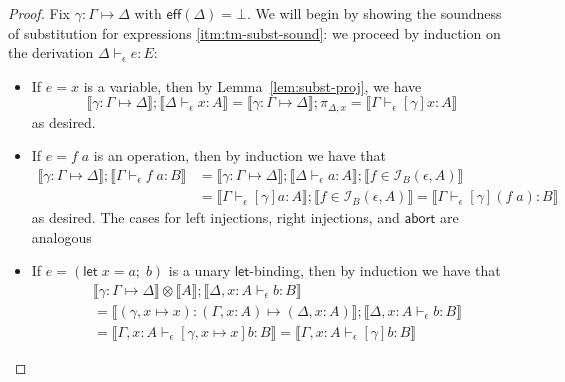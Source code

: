 \documentclass[acmsmall,screen,review]{acmart}
\newcommand{\mc}[1]{\ensuremath{\mathcal{#1}}}
\newcommand{\ms}[1]{\ensuremath{\mathsf{#1}}}
\newcommand{\letexpr}[3]{\ensuremath{\ms{let}\;#1 = #2;\;#3}}
\newcommand{\bhyp}[2]{#1 : #2}
\newcommand{\hasty}[4]{#1 \vdash_{#2} #3: {#4}}
\newcommand{\isop}[4]{#1 \in \mc{I}_{#4}(#2, #3)}
\newcommand{\issubst}[3]{#1: #2 \mapsto #3}
\newcommand{\dnt}[1]{\llbracket{#1}\rrbracket}
\begin{document}
\soundnesssubst*

\label{proof:soundness-subst}

\begin{proof}
  Fix $\issubst{\gamma}{\Gamma}{\Delta}$ with $\ms{eff}(\Delta) = \bot$. We will begin by showing
  the soundness of substitution for expressions \ref{itm:tm-subst-sound}: we proceed by induction
  on the derivation $\hasty{\Delta}{\epsilon}{e}{E}$:
  \begin{itemize}[leftmargin=*]
    \item If $e = x$ is a variable, then by Lemma~\ref{lem:subst-proj}, we have
    \begin{equation}
      \dnt{\issubst{\gamma}{\Gamma}{\Delta}} ; \dnt{\hasty{\Delta}{\epsilon}{x}{A}} 
      = \dnt{\issubst{\gamma}{\Gamma}{\Delta}} ; \pi_{\Delta, x}
      = \dnt{\hasty{\Gamma}{\epsilon}{[\gamma]x}{A}}
    \end{equation}
    as desired.
    \item If $e = f\;a$ is an operation, then by induction we have that
    \begin{equation}
      \begin{aligned}
      \dnt{\issubst{\gamma}{\Gamma}{\Delta}} ; \dnt{\hasty{\Gamma}{\epsilon}{f\;a}{B}}
      &= \dnt{\issubst{\gamma}{\Gamma}{\Delta}} 
      ; \dnt{\hasty{\Delta}{\epsilon}{a}{A}} 
      ; \dnt{\isop{f}{\epsilon}{A}{B}}
      \\ &= \dnt{\hasty{\Gamma}{\epsilon}{[\gamma]a}{A}}
      ; \dnt{\isop{f}{\epsilon}{A}{B}}
      = \dnt{\hasty{\Gamma}{\epsilon}{[\gamma](f\;a)}{B}}
      \end{aligned}
    \end{equation}
    as desired. The cases for left injections, right injections, and \ms{abort} are analogous
    \item If $e = (\letexpr{x}{a}{b})$ is a unary \ms{let}-binding, then by induction we have that
    \begin{equation}
      \begin{aligned}
      & \dnt{\issubst{\gamma}{\Gamma}{\Delta}} \otimes \dnt{A} 
      ; \dnt{\hasty{\Delta, \bhyp{x}{A}}{\epsilon}{b}{B}}
      \\ &= \dnt{\issubst{(\gamma, x \mapsto x)}{(\Gamma, \bhyp{x}{A})}{(\Delta, \bhyp{x}{A})}}
      ; \dnt{\hasty{\Delta, \bhyp{x}{A}}{\epsilon}{b}{B}}
      \\ &= \dnt{\hasty{\Gamma, \bhyp{x}{A}}{\epsilon}{[\gamma, x \mapsto x]b}{B}}
          = \dnt{\hasty{\Gamma, \bhyp{x}{A}}{\epsilon}{[\gamma]b}{B}}
      \end{aligned}

\end{equation}
\end{itemize}
\end{proof}
\end{document}
